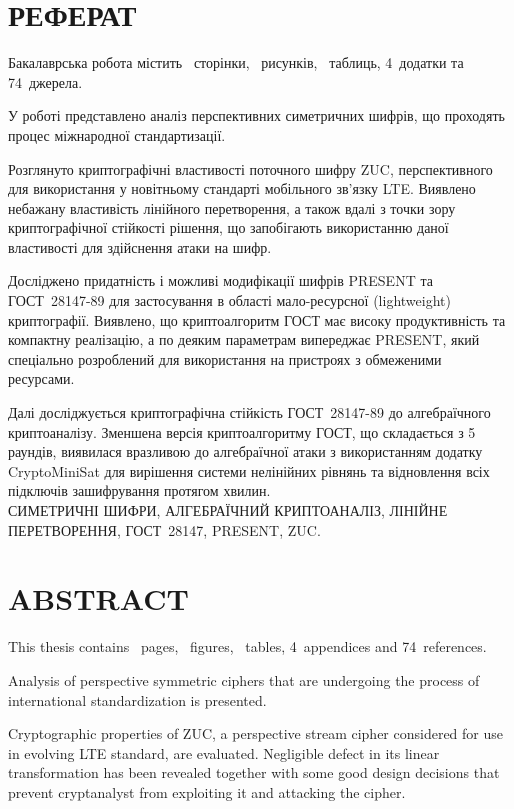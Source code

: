 % 
% 

\newpage
\chapter*{РЕФЕРАТ}
    Бакалаврська робота містить ~сторінки, \totfig~рисунків,
    \tottab~таблиць, 4~додатки та 74~джерела.

    У роботі представлено аналіз перспективних симетричних шифрів, що проходять процес
    міжнародної стандартизації.

    Розглянуто криптографічні властивості поточного шифру ZUC, перспективного
    для використання у новітньому стандарті мобільного зв'язку LTE. Виявлено
    небажану властивість лінійного перетворення,
    а також вдалі з точки зору криптографічної стійкості рішення, що
    запобігають використанню даної властивості для здійснення атаки на шифр.

    Досліджено придатність і можливі модифікації шифрів PRESENT та
    ГОСТ~28147-89 для застосування в області мало-ресурсної (lightweight)
    криптографії. Виявлено, що криптоалгоритм ГОСТ має високу продуктивність та
    компактну реалізацію, а по деяким параметрам випереджає PRESENT, який
    спеціально розроблений для використання на пристроях з обмеженими
    ресурсами.

    Далі досліджується криптографічна стійкість ГОСТ~28147-89 до алгебраїчного
    криптоаналізу. Зменшена версія криптоалгоритму ГОСТ, що складається з 5
    раундів, виявилася вразливою до алгебраїчної атаки з використанням
    додатку CryptoMiniSat для вирішення системи нелінійних рівнянь та
    відновлення всіх підключів зашифрування протягом хвилин. \\[1em]

    СИМЕТРИЧНІ ШИФРИ, АЛГЕБРАЇЧНИЙ КРИПТОАНАЛІЗ, ЛІНІЙНЕ ПЕРЕТВОРЕННЯ,
    ГОСТ~28147, PRESENT, ZUC.

\newpage
\chapter*{ABSTRACT}
    This thesis contains ~pages, \totfig~figures, \tottab~tables,
    4~appendices and 74~references.

    Analysis of perspective symmetric ciphers that are
    undergoing the process of international standardization is presented.

    Cryptographic properties of ZUC, a perspective stream cipher considered
    for use in evolving LTE standard, are evaluated. Negligible defect in its
    linear transformation has been revealed together with some good design
    decisions that prevent cryptanalyst from exploiting it and attacking the cipher.

